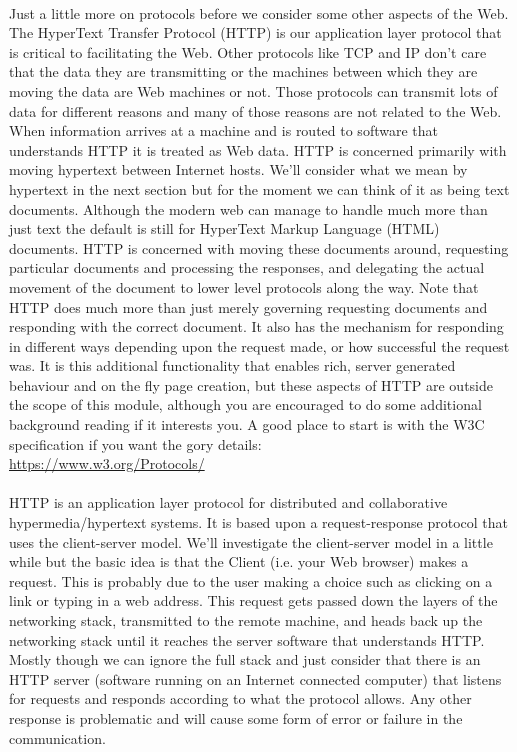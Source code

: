 \paragraph{} Just a little more on protocols before we consider some other aspects of the Web. The HyperText Transfer Protocol (HTTP) is our application layer protocol that is critical to facilitating the Web. Other protocols like TCP and IP don't care that the data they are transmitting or the machines between which they are moving the data are Web machines or not. Those protocols can transmit lots of data for different reasons and many of those reasons are not related to the Web.  When information arrives at a machine and is routed to software that understands HTTP it is treated as Web data. HTTP is concerned primarily with moving hypertext between Internet hosts. We'll consider what we mean by hypertext in the next section but for the moment we can think of it as being text documents. Although the modern web can manage to handle much more than just text the default is still for HyperText Markup Language (HTML) documents. HTTP is concerned with moving these documents around, requesting particular documents and processing the responses, and delegating the actual movement of the document to lower level protocols along the way. Note that HTTP does much more than just merely governing requesting documents and responding with the correct document. It also has the mechanism for responding in different ways depending upon the request made, or how successful the request was. It is this additional functionality that enables rich, server generated behaviour and on the fly page creation, but these aspects of HTTP are outside the scope of this module, although you are encouraged to do some additional background reading if it interests you. A good place to start is with the W3C specification if you want the gory details: \\
	\url{https://www.w3.org/Protocols/}
\paragraph{} HTTP is an application layer protocol for distributed and collaborative hypermedia/hypertext systems. It is based upon a request-response protocol that uses the client-server model. We'll investigate the client-server model in a little while but the basic idea is that the Client (i.e. your Web browser) makes a request. This is probably due to the user making a choice such as clicking on a link or typing in a web address. This request gets passed down the layers of the networking stack, transmitted to the remote machine, and heads back up the networking stack until it reaches the server software that understands HTTP.  Mostly though we can ignore the full stack and just consider that there is an HTTP server (software running on an Internet connected computer) that listens for requests and responds according to what the protocol allows. Any other response is problematic and will cause some form of error or failure in the communication. 

